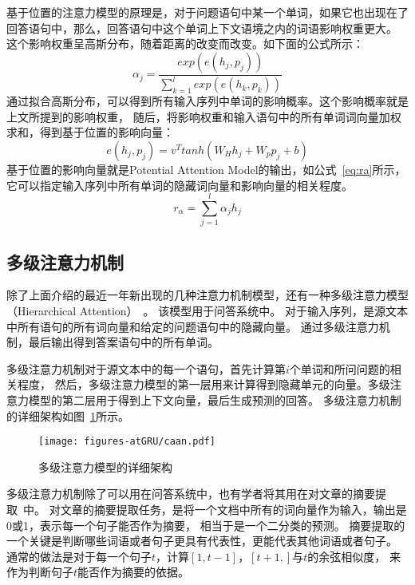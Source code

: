 基于位置的注意力模型的原理是，对于问题语句中某一个单词，如果它也出现在了回答语句中，那么，回答语句中这个单词上下文语境之内的词语影响权重更大。
这个影响权重呈高斯分布，随着距离的改变而改变。如下面的公式所示：
\begin{equation}
\alpha _{j}=\frac{exp\left ( e\left ( h_{j},p_{j} \right ) \right )}{\sum_{k=1}^{l}exp\left ( e\left ( h_{k},p_{k} \right ) \right )}
\end{equation}
通过拟合高斯分布，可以得到所有输入序列中单词的影响概率。这个影响概率就是上文所提到的影响权重，
随后，将影响权重和输入语句中的所有单词词向量加权求和，得到基于位置的影响向量：
\begin{equation}
e\left ( h_{j},p_{j} \right )=v^{T}tanh\left ( W_{H}h_{j}+W_{p}p_{j}+b \right )
\end{equation}
基于位置的影响向量就是Potential Attention Model的输出，如公式~\ref{eq:ra}所示，它可以指定输入序列中所有单词的隐藏词向量和影响向量的相关程度。
\begin{equation}
r_{\alpha }=\sum_{j=1}^{l}\alpha _{j}h_{j}
\label{eq:ra}
\end{equation}

\subsection{多级注意力机制}

除了上面介绍的最近一年新出现的几种注意力机制模型，还有一种多级注意力模型（Hierarchical Attention）~。
该模型用于问答系统中。
对于输入序列，是源文本中所有语句的所有词向量和给定的问题语句中的隐藏向量。
通过多级注意力机制，最后输出得到答案语句中的所有单词。

多级注意力机制对于源文本中的每一个语句，首先计算第${i}$个单词和所问问题的相关程度，
然后，多级注意力模型的第一层用来计算得到隐藏单元的向量。多级注意力模型的第二层用于得到上下文向量，最后生成预测的回答。
多级注意力机制的详细架构如图~\ref{fig:caan}所示。

\begin{figure}[h!]
	\centering
	\texttt{[image: figures-atGRU/caan.pdf]}
	\caption{多级注意力模型的详细架构}
	\label{fig:caan}
\end{figure}

多级注意力机制除了可以用在问答系统中，也有学者将其用在对文章的摘要提取~中。
对文章的摘要提取任务，是将一个文档中所有的词向量作为输入，输出是0或1，表示每一个句子能否作为摘要，
相当于是一个二分类的预测。
摘要提取的一个关键是判断哪些词语或者句子更具有代表性，更能代表其他词语或者句子。
通常的做法是对于每一个句子${t}$，计算${\left [ 1,t-1 \right ]}$，${\left [ t+1, \right ]}$与${t}$的余弦相似度，
来作为判断句子${t}$能否作为摘要的依据。

